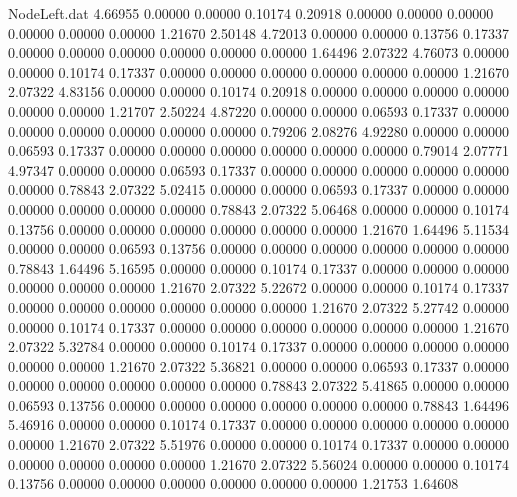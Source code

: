 \begin{filecontents}{NodeLeft.dat}
   4.66955    0.00000    0.00000     0.10174    0.20918    0.00000    0.00000    0.00000    0.00000    0.00000    0.00000    1.21670    2.50148
   4.72013    0.00000    0.00000     0.13756    0.17337    0.00000    0.00000    0.00000    0.00000    0.00000    0.00000    1.64496    2.07322
   4.76073    0.00000    0.00000     0.10174    0.17337    0.00000    0.00000    0.00000    0.00000    0.00000    0.00000    1.21670    2.07322
   4.83156    0.00000    0.00000     0.10174    0.20918    0.00000    0.00000    0.00000    0.00000    0.00000    0.00000    1.21707    2.50224
   4.87220    0.00000    0.00000     0.06593    0.17337    0.00000    0.00000    0.00000    0.00000    0.00000    0.00000    0.79206    2.08276
   4.92280    0.00000    0.00000     0.06593    0.17337    0.00000    0.00000    0.00000    0.00000    0.00000    0.00000    0.79014    2.07771
   4.97347    0.00000    0.00000     0.06593    0.17337    0.00000    0.00000    0.00000    0.00000    0.00000    0.00000    0.78843    2.07322
   5.02415    0.00000    0.00000     0.06593    0.17337    0.00000    0.00000    0.00000    0.00000    0.00000    0.00000    0.78843    2.07322
   5.06468    0.00000    0.00000     0.10174    0.13756    0.00000    0.00000    0.00000    0.00000    0.00000    0.00000    1.21670    1.64496
   5.11534    0.00000    0.00000     0.06593    0.13756    0.00000    0.00000    0.00000    0.00000    0.00000    0.00000    0.78843    1.64496
   5.16595    0.00000    0.00000     0.10174    0.17337    0.00000    0.00000    0.00000    0.00000    0.00000    0.00000    1.21670    2.07322
   5.22672    0.00000    0.00000     0.10174    0.17337    0.00000    0.00000    0.00000    0.00000    0.00000    0.00000    1.21670    2.07322
   5.27742    0.00000    0.00000     0.10174    0.17337    0.00000    0.00000    0.00000    0.00000    0.00000    0.00000    1.21670    2.07322
   5.32784    0.00000    0.00000     0.10174    0.17337    0.00000    0.00000    0.00000    0.00000    0.00000    0.00000    1.21670    2.07322
   5.36821    0.00000    0.00000     0.06593    0.17337    0.00000    0.00000    0.00000    0.00000    0.00000    0.00000    0.78843    2.07322
   5.41865    0.00000    0.00000     0.06593    0.13756    0.00000    0.00000    0.00000    0.00000    0.00000    0.00000    0.78843    1.64496
   5.46916    0.00000    0.00000     0.10174    0.17337    0.00000    0.00000    0.00000    0.00000    0.00000    0.00000    1.21670    2.07322
   5.51976    0.00000    0.00000     0.10174    0.17337    0.00000    0.00000    0.00000    0.00000    0.00000    0.00000    1.21670    2.07322
   5.56024    0.00000    0.00000     0.10174    0.13756    0.00000    0.00000    0.00000    0.00000    0.00000    0.00000    1.21753    1.64608

\end{filecontents}
